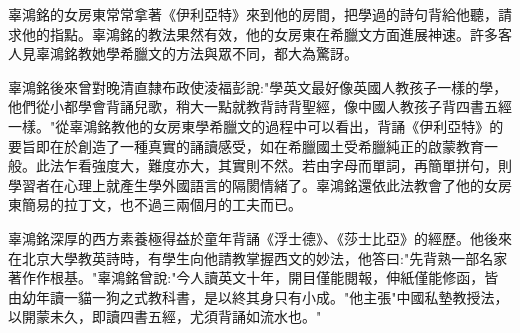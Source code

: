 辜鴻銘的女房東常常拿著《伊利亞特》來到他的房間，把學過的詩句背給他聽，請求他的指點。辜鴻銘的教法果然有效，他的女房東在希臘文方面進展神速。許多客人見辜鴻銘教她學希臘文的方法與眾不同，都大為驚訝。

辜鴻銘後來曾對晚清直隸布政使淩福彭說:"學英文最好像英國人教孩子一樣的學，他們從小都學會背誦兒歌，稍大一點就教背詩背聖經，像中國人教孩子背四書五經一樣。"從辜鴻銘教他的女房東學希臘文的過程中可以看出，背誦《伊利亞特》的要旨即在於創造了一種真實的誦讀感受，如在希臘國土受希臘純正的啟蒙教育一般。此法乍看強度大，難度亦大，其實則不然。若由字母而單詞，再簡單拼句，則學習者在心理上就產生學外國語言的隔閡情緒了。辜鴻銘還依此法教會了他的女房東簡易的拉丁文，也不過三兩個月的工夫而已。

辜鴻銘深厚的西方素養極得益於童年背誦《浮士德》、《莎士比亞》的經歷。他後來在北京大學教英詩時，有學生向他請教掌握西文的妙法，他答曰:"先背熟一部名家著作作根基。"辜鴻銘曾說:"今人讀英文十年，開目僅能閱報，伸紙僅能修函，皆由幼年讀一貓一狗之式教科書，是以終其身只有小成。"他主張"中國私墊教授法，以開蒙未久，即讀四書五經，尤須背誦如流水也。"

